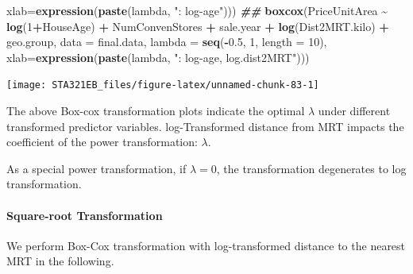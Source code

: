 \documentclass[
]{book}
\newenvironment{Shaded}{\begin{snugshade}}{\end{snugshade}}
\newcommand{\AttributeTok}[1]{\textcolor[rgb]{0.13,0.29,0.53}{#1}}
\newcommand{\DecValTok}[1]{\textcolor[rgb]{0.00,0.00,0.81}{#1}}
\newcommand{\DocumentationTok}[1]{\textcolor[rgb]{0.56,0.35,0.01}{\textbf{\textit{#1}}}}
\newcommand{\FloatTok}[1]{\textcolor[rgb]{0.00,0.00,0.81}{#1}}
\newcommand{\FunctionTok}[1]{\textcolor[rgb]{0.13,0.29,0.53}{\textbf{#1}}}
\newcommand{\NormalTok}[1]{#1}
\newcommand{\OtherTok}[1]{\textcolor[rgb]{0.56,0.35,0.01}{#1}}
\newcommand{\SpecialCharTok}[1]{\textcolor[rgb]{0.81,0.36,0.00}{\textbf{#1}}}
\newcommand{\StringTok}[1]{\textcolor[rgb]{0.31,0.60,0.02}{#1}}
\begin{document}
\begin{Shaded}
\begin{Highlighting}[]
       \AttributeTok{xlab=}\FunctionTok{expression}\NormalTok{(}\FunctionTok{paste}\NormalTok{(lambda, }\StringTok{": log{-}age"}\NormalTok{)))}
\DocumentationTok{\#\#}
\FunctionTok{boxcox}\NormalTok{(PriceUnitArea }\SpecialCharTok{\textasciitilde{}} \FunctionTok{log}\NormalTok{(}\DecValTok{1}\SpecialCharTok{+}\NormalTok{HouseAge) }\SpecialCharTok{+}\NormalTok{ NumConvenStores }\SpecialCharTok{+}\NormalTok{ sale.year }\SpecialCharTok{+}  \FunctionTok{log}\NormalTok{(Dist2MRT.kilo)  }\SpecialCharTok{+} 
\NormalTok{      geo.group, }\AttributeTok{data =}\NormalTok{ final.data, }\AttributeTok{lambda =} \FunctionTok{seq}\NormalTok{(}\SpecialCharTok{{-}}\FloatTok{0.5}\NormalTok{, }\DecValTok{1}\NormalTok{, }\AttributeTok{length =} \DecValTok{10}\NormalTok{), }
      \AttributeTok{xlab=}\FunctionTok{expression}\NormalTok{(}\FunctionTok{paste}\NormalTok{(lambda, }\StringTok{": log{-}age, log.dist2MRT"}\NormalTok{)))}
\end{Highlighting}
\end{Shaded}

\begin{center}\texttt{[image: STA321EB\_files/figure-latex/unnamed-chunk-83-1]} \end{center}

The above Box-cox transformation plots indicate the optimal \(\lambda\) under different transformed predictor variables. log-Transformed distance from MRT impacts the coefficient of the power transformation: \(\lambda\).

As a special power transformation, if \(\lambda = 0\), the transformation degenerates to log transformation.

\hypertarget{square-root-transformation}{%
\paragraph{Square-root Transformation}\label{square-root-transformation}}

We perform Box-Cox transformation with log-transformed distance to the nearest MRT in the following.

\begin{Shaded}
\end{Shaded}
\end{document}
